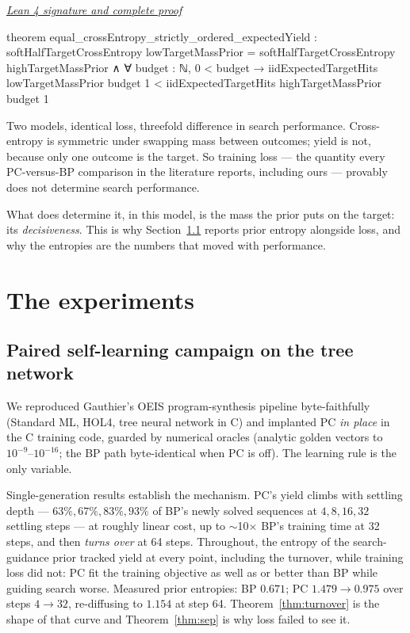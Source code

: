 \documentclass[11pt]{article}
\newcommand{\leancommit}{647168959fc57cfe97526d9525d33e63681b8e2f}
\newcommand{\leansignaturelink}[2]{%
  \par\Needspace{0.3\textheight}\smallskip\noindent
  \href{https://github.com/zariuq/MeTTapedia/blob/\leancommit/#1\#L#2}{%
    \scriptsize\itshape Lean 4 signature and complete proof}\par\nobreak}
\begin{document}
\leansignaturelink{lean/mettapedia/Mettapedia/MachineLearning/SearchGuidance/%
DecisivenessYield.lean}{242}
\begin{leansignature}
theorem equal_crossEntropy_strictly_ordered_expectedYield :
    softHalfTargetCrossEntropy lowTargetMassPrior =
        softHalfTargetCrossEntropy highTargetMassPrior ∧
      ∀ budget : ℕ, 0 < budget →
        iidExpectedTargetHits lowTargetMassPrior budget 1 <
          iidExpectedTargetHits highTargetMassPrior budget 1
\end{leansignature}

Two models, identical loss, threefold difference in search performance. Cross-entropy is
symmetric under swapping mass between outcomes; yield is not, because only one outcome is
the target. So training loss --- the quantity every PC-versus-BP comparison in the
literature reports, including ours --- provably does not determine search performance.

What does determine it, in this model, is the mass the prior puts on the target: its
\emph{decisiveness}. This is why Section~\ref{sec:tree} reports prior entropy alongside
loss, and why the entropies are the numbers that moved with performance.

\section{The experiments}
\label{sec:experiments}

\subsection{Paired self-learning campaign on the tree network}
\label{sec:tree}

We reproduced Gauthier's OEIS program-synthesis pipeline byte-faithfully (Standard ML,
HOL4, tree neural network in C) and implanted PC \emph{in place} in the C training code,
guarded by numerical oracles (analytic golden vectors to $10^{-9}$--$10^{-16}$; the BP
path byte-identical when PC is off). The learning rule is the only variable.

Single-generation results establish the mechanism. PC's yield climbs with settling depth
--- $63\%, 67\%, 83\%, 93\%$ of BP's newly solved sequences at $4, 8, 16, 32$ settling
steps --- at roughly linear cost, up to $\sim$10$\times$ BP's training time at 32 steps,
and then \emph{turns over} at 64 steps. Throughout, the entropy of the search-guidance
prior tracked yield at every point, including the turnover, while training loss did not:
PC fit the training objective as well as or better than BP while guiding search worse.
Measured prior entropies: BP $0.671$; PC $1.479 \to 0.975$ over steps $4 \to 32$,
re-diffusing to $1.154$ at step 64. Theorem~\ref{thm:turnover} is the shape of that
curve and Theorem~\ref{thm:sep} is why loss failed to see it.
\end{document}
